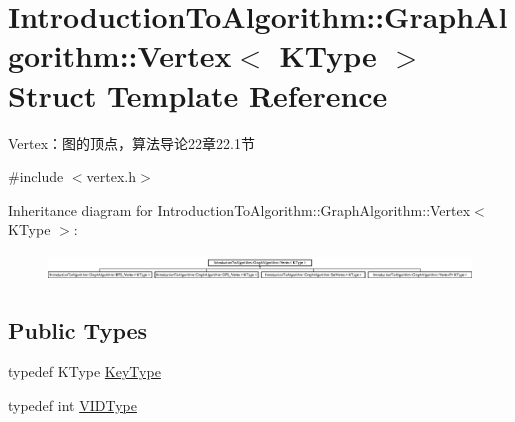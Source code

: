 \hypertarget{struct_introduction_to_algorithm_1_1_graph_algorithm_1_1_vertex}{}\section{Introduction\+To\+Algorithm\+:\+:Graph\+Algorithm\+:\+:Vertex$<$ K\+Type $>$ Struct Template Reference}
\label{struct_introduction_to_algorithm_1_1_graph_algorithm_1_1_vertex}


Vertex：图的顶点，算法导论22章22.1节  




{\ttfamily \#include $<$vertex.\+h$>$}

Inheritance diagram for Introduction\+To\+Algorithm\+:\+:Graph\+Algorithm\+:\+:Vertex$<$ K\+Type $>$\+:\begin{figure}[H]
\begin{center}
\leavevmode
\includegraphics[height=0.732984cm]{struct_introduction_to_algorithm_1_1_graph_algorithm_1_1_vertex}
\end{center}
\end{figure}
\subsection*{Public Types}
\begin{DoxyCompactItemize}
\item 
typedef K\+Type \hyperlink{struct_introduction_to_algorithm_1_1_graph_algorithm_1_1_vertex_a14e958c58a404474853491eb811954cc}{Key\+Type}
\item 
typedef int \hyperlink{struct_introduction_to_algorithm_1_1_graph_algorithm_1_1_vertex_a290c84c0dcf159f833c72c47a2d4d44a}{V\+I\+D\+Type}
\end{DoxyCompactItemize}
